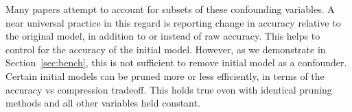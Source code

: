 
Many papers attempt to account for subsets of these confounding variables. A near universal practice in this regard is reporting change in accuracy relative to the original model, in addition to or instead of raw accuracy. This helps to control for the accuracy of the initial model. However, as we demonstrate in Section~\ref{sec:bench}, this is not sufficient to remove initial model as a confounder. Certain initial models can be pruned more or less efficiently, in terms of the accuracy vs compression tradeoff. This holds true even with identical pruning methods and all other variables held constant.




